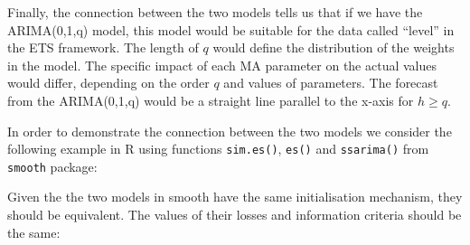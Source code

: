 \documentclass[
]{book}
\newenvironment{Shaded}{\begin{snugshade}}{\end{snugshade}}
\newcommand{\AttributeTok}[1]{\textcolor[rgb]{0.77,0.63,0.00}{#1}}
\newcommand{\CommentTok}[1]{\textcolor[rgb]{0.56,0.35,0.01}{\textit{#1}}}
\newcommand{\DecValTok}[1]{\textcolor[rgb]{0.00,0.00,0.81}{#1}}
\newcommand{\FloatTok}[1]{\textcolor[rgb]{0.00,0.00,0.81}{#1}}
\newcommand{\FunctionTok}[1]{\textcolor[rgb]{0.00,0.00,0.00}{#1}}
\newcommand{\NormalTok}[1]{#1}
\newcommand{\OtherTok}[1]{\textcolor[rgb]{0.56,0.35,0.01}{#1}}
\newcommand{\SpecialCharTok}[1]{\textcolor[rgb]{0.00,0.00,0.00}{#1}}
\newcommand{\StringTok}[1]{\textcolor[rgb]{0.31,0.60,0.02}{#1}}
\theoremstyle{definition}
\theoremstyle{definition}
\theoremstyle{definition}
\theoremstyle{definition}
\theoremstyle{remark}
\begin{document}
Finally, the connection between the two models tells us that if we have the ARIMA(0,1,q) model, this model would be suitable for the data called ``level'' in the ETS framework. The length of \(q\) would define the distribution of the weights in the model. The specific impact of each MA parameter on the actual values would differ, depending on the order \(q\) and values of parameters. The forecast from the ARIMA(0,1,q) would be a straight line parallel to the x-axis for \(h\geq q\).

In order to demonstrate the connection between the two models we consider the following example in R using functions \texttt{sim.es()}, \texttt{es()} and \texttt{ssarima()} from \texttt{smooth} package:

\begin{Shaded}
\end{Shaded}

Given the the two models in smooth have the same initialisation mechanism, they should be equivalent. The values of their losses and information criteria should be the same:

\begin{Shaded}
\end{Shaded}
\end{document}
